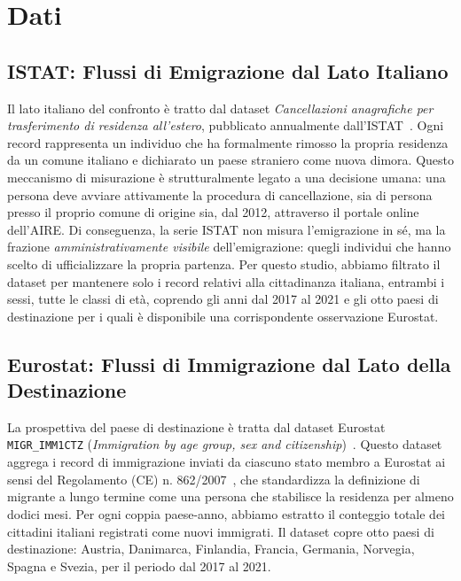 \section{Dati}\label{sec:data}

\subsection{ISTAT: Flussi di Emigrazione dal Lato Italiano}
\label{subsec:data_istat}
Il lato italiano del confronto è tratto dal dataset \textit{Cancellazioni anagrafiche per trasferimento di residenza all'estero}, pubblicato annualmente dall'ISTAT~\cite{istat_iscrizioni}.
Ogni record rappresenta un individuo che ha formalmente rimosso la propria residenza da un comune italiano e dichiarato un paese straniero come nuova dimora.
Questo meccanismo di misurazione è strutturalmente legato a una decisione umana: una persona deve avviare attivamente la procedura di cancellazione, sia di persona presso il proprio comune di origine sia, dal 2012, attraverso il portale online dell'AIRE.
Di conseguenza, la serie ISTAT non misura l'emigrazione in sé, ma la frazione \emph{amministrativamente visibile} dell'emigrazione: quegli individui che hanno scelto di ufficializzare la propria partenza.
Per questo studio, abbiamo filtrato il dataset per mantenere solo i record relativi alla cittadinanza italiana, entrambi i sessi, tutte le classi di età, coprendo gli anni dal 2017 al 2021 e gli otto paesi di destinazione per i quali è disponibile una corrispondente osservazione Eurostat.
\subsection{Eurostat: Flussi di Immigrazione dal Lato della Destinazione}
\label{subsec:data_eurostat}

La prospettiva del paese di destinazione è tratta dal dataset Eurostat \texttt{MIGR\_IMM1CTZ} (\textit{Immigration by age group, sex and citizenship})~\cite{eurostat_migr_imm1ctz}.
Questo dataset aggrega i record di immigrazione inviati da ciascuno stato membro a Eurostat ai sensi del Regolamento (CE) n. 862/2007~\cite{ec_regulation_862_2007}, che standardizza la definizione di migrante a lungo termine come una persona che stabilisce la residenza per almeno dodici mesi.
Per ogni coppia paese-anno, abbiamo estratto il conteggio totale dei cittadini italiani registrati come nuovi immigrati.
Il dataset copre otto paesi di destinazione: Austria, Danimarca, Finlandia, Francia, Germania, Norvegia, Spagna e Svezia, per il periodo dal 2017 al 2021.

